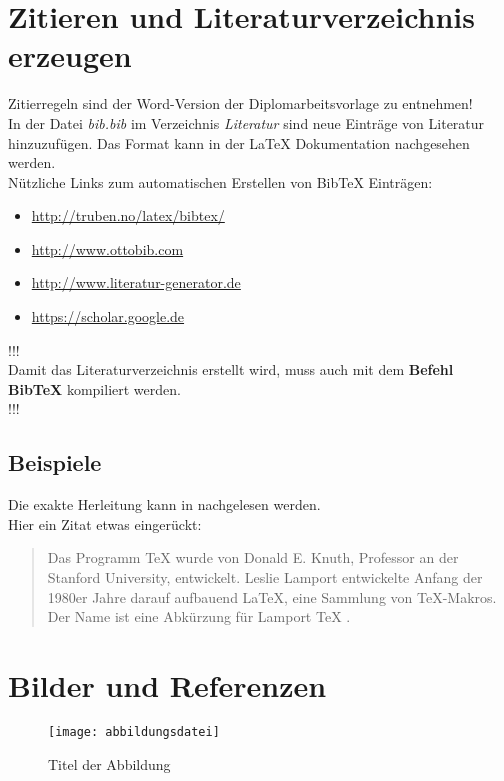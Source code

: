 \section{Zitieren und Literaturverzeichnis erzeugen}
Zitierregeln sind der Word-Version der Diplomarbeitsvorlage zu entnehmen! \\
In der Datei \textit{bib.bib} im Verzeichnis \textit{Literatur} sind neue Eintr\"age von Literatur hinzuzuf\"ugen. Das Format kann in der \LaTeX{} Dokumentation nachgesehen werden. \\
N\"utzliche Links zum automatischen Erstellen von BibTeX Eintr\"agen:
\begin{itemize}
	\item \url{http://truben.no/latex/bibtex/}
	\item \url{http://www.ottobib.com}
	\item \url{http://www.literatur-generator.de}
	\item \url{https://scholar.google.de}
\end{itemize}

\begin{center}
\Large{!!! \\Damit das Literaturverzeichnis erstellt wird, muss auch mit dem \textbf{Befehl BibTeX} kompiliert werden.\\ !!!}
\end{center}


\subsection{Beispiele}
Die exakte Herleitung kann in \cite{Prager1961} nachgelesen werden. \\
Hier ein Zitat etwas einger\"uckt:
\begin{quote}
Das Programm TeX wurde von Donald E. Knuth, Professor an der Stanford University, entwickelt. Leslie Lamport entwickelte Anfang der 1980er Jahre darauf aufbauend LaTeX, eine Sammlung von TeX-Makros. Der Name ist eine Abk\"urzung f\"ur Lamport TeX \cite{latextug}.
\end{quote}

\section{Bilder und Referenzen}
\begin{figure}[htbp]
\centering
\texttt{[image: abbildungsdatei]} %
\caption{Titel der Abbildung} 
\label{fig:bild1}
\end{figure}

